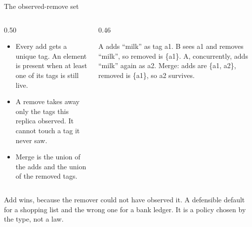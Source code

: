 \documentclass[10pt,aspectratio=169,t]{beamer}
\begin{document}
\begin{frame}[eyebrow=CRDTs]{The observed-remove set}
  \vskip 3mm
  \begin{columns}[T]
    \begin{column}{0.50\textwidth}
      \begin{itemize}
        \item Every add gets a unique tag. An element is present when at least one of its tags is still live.
        \item A remove takes away only the tags this replica observed. It cannot touch a tag it never saw.
        \item Merge is the union of the adds and the union of the removed tags.
      \end{itemize}
    \end{column}
    \begin{column}{0.46\textwidth}
      \begin{hint}
        A adds ``milk'' as tag a1. B sees a1 and removes ``milk'', so removed is \{a1\}. A, concurrently, adds ``milk'' again as a2. Merge: adds are \{a1, a2\}, removed is \{a1\}, so a2 survives.
      \end{hint}
    \end{column}
  \end{columns}
  \begin{takeaway}{Add wins, because the remover could not have observed it.}
    A defensible default for a shopping list and the wrong one for a bank ledger. It is a policy chosen by the type, not a law.
  \end{takeaway}
\end{frame}
\end{document}
